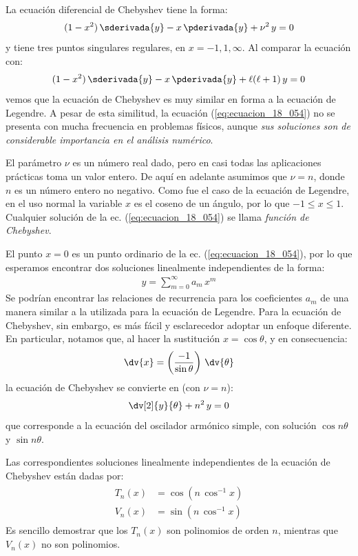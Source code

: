 La ecuación diferencial de Chebyshev tiene la forma:
\begin{align}
(1 - x^{2}) \, \sderivada{y} - x \, \pderivada{y} + \nu^{2} \, y
 = 0
 \label{eq:ecuacion_18_054}
\end{align}
y tiene tres puntos singulares regulares, en $x = -1, 1, \infty$. Al comparar la ecuación con:
\begin{align*}
(1 - x^{2}) \, \sderivada{y} - x \, \pderivada{y} + \ell (\ell + 1) \, y = 0
\end{align*}
vemos que la ecuación de Chebyshev es muy similar en forma a la ecuación de Legendre. A pesar de esta similitud, la ecuación (\ref{eq:ecuacion_18_054}) no se presenta con mucha frecuencia en problemas físicos, aunque \emph{sus soluciones son de considerable importancia en el análisis numérico}.
\par
El parámetro $\nu$ es un número real dado, pero en casi todas las aplicaciones prácticas toma un valor entero. De aquí en adelante asumimos que $\nu = n$, donde $n$ es un número entero no negativo. Como fue el caso de la ecuación de Legendre, en el uso normal la variable $x$ es el coseno de un ángulo, por lo que $-1 \leq x \leq 1$. Cualquier solución de la ec. (\ref{eq:ecuacion_18_054}) se llama \emph{función de Chebyshev}.
\par
El punto $x = 0$ es un punto ordinario de la ec. (\ref{eq:ecuacion_18_054}), por lo que esperamos encontrar
dos soluciones linealmente independientes de la forma:
\begin{align*}
y = \sum_{m=0}^{\infty} a_{m} \, x^{m}
\end{align*}
Se podrían encontrar las relaciones de recurrencia para los coeficientes $a_{m}$ de una manera similar a la utilizada para la ecuación de Legendre. Para la ecuación de Chebyshev, sin embargo, es más fácil y esclarecedor adoptar un enfoque diferente. En particular, notamos que, al hacer la sustitución $x = \cos \theta$, y en consecuencia:
\begin{align*}
\dv{x} = \left( \dfrac{-1}{\sin \theta} \right) \, \dv{\theta}
\end{align*}
la ecuación de Chebyshev se convierte en (con $\nu = n$):
\begin{align*}
\dv[2]{y}{\theta} + n^{2} \, y = 0
\end{align*}
que corresponde a la ecuación del oscilador armónico simple, con solución $\cos n \theta$ y $\sin n \theta$. 
\par
Las correspondientes soluciones linealmente independientes de la ecuación de Chebyshev están dadas por:
\begin{align}
\begin{aligned}
T_{n} (x) &= \cos (n \, \cos^{-1} x) \\[0.5em]
V_{n} (x) &= \sin (n \, \cos^{-1} x)
\end{aligned}
\label{eq:ecuacion_18_055}
\end{align}
Es sencillo demostrar que los $T_{n} (x)$ son polinomios de orden $n$, mientras que $V_{n} (x)$ no son polinomios.


